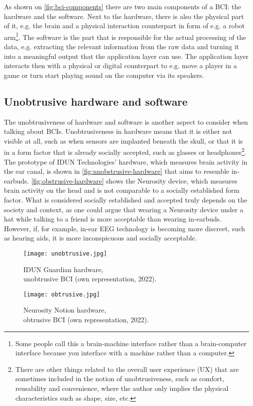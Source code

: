 As shown on \autoref{fig:bci-components} there are two main components of a BCI: the hardware and the software. Next to the hardware, there is also the physical part of it, e.g. the brain and a physical interaction counterpart in form of e.g. a robot arm\footnote{Some people call this a brain-machine interface rather than a brain-computer interface because you interface with a machine rather than a computer.}. The software is the part that is responsible for the actual processing of the data, e.g. extracting the relevant information from the raw data and turning it into a meaningful output that the application layer can use. The application layer interacts then with a physical or digital counterpart to e.g. move a player in a game or turn start playing sound on the computer via its speakers.

\subsection{Unobtrusive hardware and software}
\label{chapter2-unobtrusive-hardware-and-software}

The unobtrusiveness of hardware and software is another aspect to consider when talking about BCIs. Unobtrusiveness in hardware means that it is either not visible at all, such as when sensors are implanted beneath the skull, or that it is in a form factor that is already socially accepted, such as glasses or headphones\footnote{There are other things related to the overall user experience (UX) that are sometimes included in the notion of unobtrusiveness, such as comfort, reusability and convenience, where the author only implies the physical characteristics such as shape, size, etc.}. The prototype of IDUN Technologies' hardware, which measures brain activity in the ear canal, is shown in  \autoref{fig:unobstrusive-hardware} that aims to resemble in-earbuds. \autoref{fig:obstrusive-hardware} shows the Neurosity device, which measures brain activity on the head and is not comparable to a socially established form factor. What is considered socially established and accepted truly depends on the society and context, as one could argue that wearing a Neurosity device under a hat while talking to a friend is more acceptable than wearing in-earbuds. However, if, for example, in-ear EEG technology is becoming more discreet, such as hearing aids, it is more inconspicuous and socially acceptable.

\begin{figure}[!htb]
  \texttt{[image: unobtrusive.jpg]}
  \caption{IDUN Guardian hardware, \\ unobtrusive BCI (own representation, 2022).}
  \label{fig:unobstrusive-hardware}
  \endminipage\hfill
  \texttt{[image: obtrusive.jpg]}
  \caption{Neurosity Notion hardware, \\ obtrusive BCI (own representation, 2022).}
  \label{fig:obstrusive-hardware}
  \endminipage\hfill
\end{figure}

